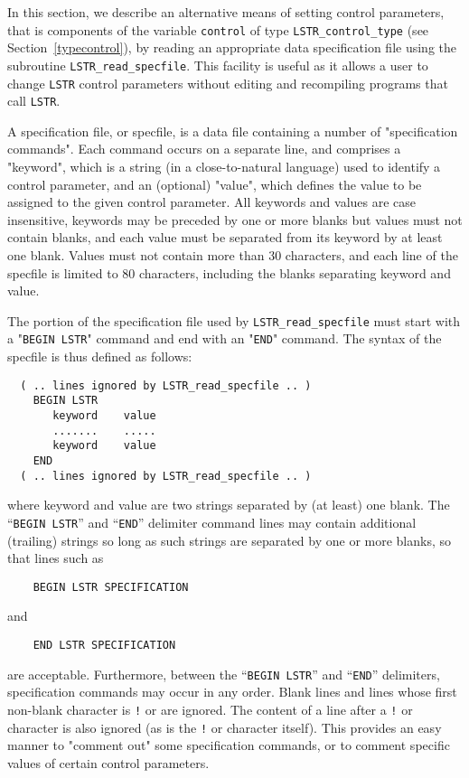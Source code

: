 \documentclass{galahad}
\newcommand{\packagename}{LS\-TR}
\begin{document}

\galfeatures
\noindent In this section, we describe an alternative means of setting
control parameters, that is components of the variable {\tt control} of type
{\tt \packagename\_control\_type}
(see Section~\ref{typecontrol}),
by reading an appropriate data specification file using the
subroutine {\tt \packagename\_read\_specfile}. This facility
is useful as it allows a user to change  {\tt \packagename} control parameters
without editing and recompiling programs that call {\tt \packagename}.

A specification file, or specfile, is a data file containing a number of
"specification commands". Each command occurs on a separate line,
and comprises a "keyword",
which is a string (in a close-to-natural language) used to identify a
control parameter, and
an (optional) "value", which defines the value to be assigned to the given
control parameter. All keywords and values are case insensitive,
keywords may be preceded by one or more blanks but
values must not contain blanks, and
each value must be separated from its keyword by at least one blank.
Values must not contain more than 30 characters, and
each line of the specfile is limited to 80 characters,
including the blanks separating keyword and value.

The portion of the specification file used by
{\tt \packagename\_read\_specfile}
must start
with a "{\tt BEGIN \packagename}" command and end with an
"{\tt END}" command.  The syntax of the specfile is thus defined as follows:
\begin{verbatim}
  ( .. lines ignored by LSTR_read_specfile .. )
    BEGIN LSTR
       keyword    value
       .......    .....
       keyword    value
    END
  ( .. lines ignored by LSTR_read_specfile .. )
\end{verbatim}
where keyword and value are two strings separated by (at least) one blank.
The ``{\tt BEGIN \packagename}'' and ``{\tt END}'' delimiter command lines
may contain additional (trailing) strings so long as such strings are
separated by one or more blanks, so that lines such as
\begin{verbatim}
    BEGIN LSTR SPECIFICATION
\end{verbatim}
and
\begin{verbatim}
    END LSTR SPECIFICATION
\end{verbatim}
are acceptable. Furthermore,
between the
``{\tt BEGIN \packagename}'' and ``{\tt END}'' delimiters,
specification commands may occur in any order.  Blank lines and
lines whose first non-blank character is {\tt !} or {\tt *} are ignored.
The content
of a line after a {\tt !} or {\tt *} character is also
ignored (as is the {\tt !} or {\tt *}
character itself). This provides an easy manner to "comment out" some
specification commands, or to comment specific values
of certain control parameters.
\end{document}
